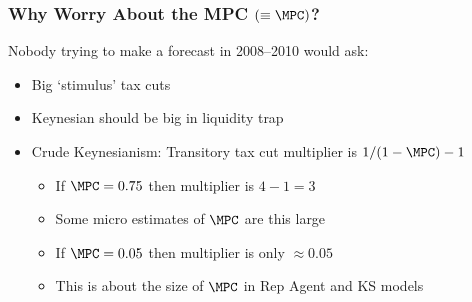 \begin{frame}\frametitle{Why Worry About the MPC $(\equiv \MPC)$?}

\pause Nobody trying to make a forecast in 2008--2010 would ask: \pause
\begin{itemize}
\item Big `stimulus' tax cuts
\item Keynesian  should be big in liquidity trap
\item Crude Keynesianism: Transitory tax cut multiplier is $1/(1-\MPC) - 1$
\begin{itemize}
\item If $\MPC = 0.75$ then multiplier is $4-1=3$
\bi
\item Some micro estimates of $\MPC$ are this large
\ei
\item If $\MPC = 0.05$ then multiplier is only $\approx 0.05$
\bi
\item This is about the size of $\MPC$ in Rep Agent and KS models
\ei
\end{itemize}
\end{itemize}

\end{frame}
